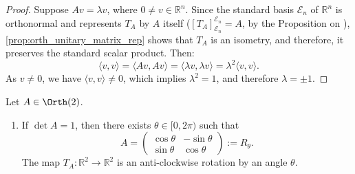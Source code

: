 \begin{proof}
Suppose $Av = \lambda v$, where $0 \neq v \in \mathbb{R}^n$. Since the standard basis $\mathcal{E}_n$ of $\mathbb{R}^n$ is orthonormal and represents $T_A$ by $A$ itself ($[T_A]_{\mathcal{E}_n}^{\mathcal{E}_n} = A$, by the Proposition on ), \cref{prop:orth_unitary_matrix_rep} shows that $T_A$ is an isometry, and therefore, it preserves the standard scalar product. Then:
\[ \langle v, v \rangle = \langle Av, Av \rangle = \langle \lambda v, \lambda v \rangle = \lambda^2 \langle v, v \rangle. \]
As $v \neq 0$, we have $\langle v, v \rangle \neq 0$, which implies $\lambda^2 = 1$, and therefore $\lambda = \pm 1$.
\end{proof}

\begin{proposition}
\label{prop:classification_o2}
Let $A \in \Orth(2)$.
\begin{enumerate}
    \item If $\det A = 1$, then there exists $\theta \in [0, 2\pi)$ such that 
    \[ A = \begin{pmatrix} \cos\theta & -\sin\theta \\ \sin\theta & \cos\theta \end{pmatrix} := R_\theta. \]
    The map $T_A \colon \mathbb{R}^2 \to \mathbb{R}^2$ is an anti-clockwise rotation by an angle $\theta$.
    

\end{enumerate}
\end{proposition}

